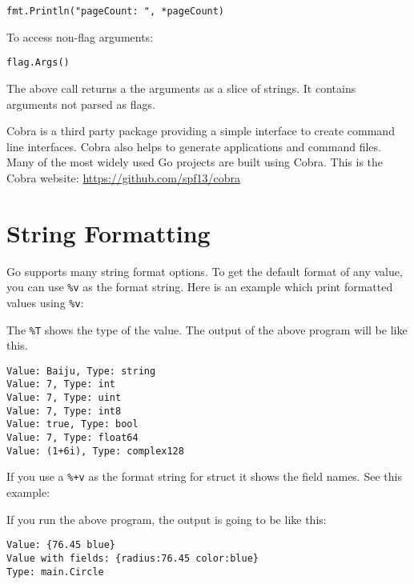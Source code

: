 \begin{lstlisting}[numbers=none]
fmt.Println("pageCount: ", *pageCount)
\end{lstlisting}

To access non-flag arguments:

\begin{lstlisting}[numbers=none]
flag.Args()
\end{lstlisting}

The above call returns a the arguments as a slice of strings.  It
contains arguments not parsed as flags.

Cobra is a third party package providing a simple interface to create
command line interfaces.  Cobra also helps to generate applications
and command files.  Many of the most widely used Go projects are built
using Cobra.  This is the Cobra
website: \url{https://github.com/spf13/cobra}

\section{String Formatting}

Go supports many string format options.  To
get the default format of any value, you can use \texttt{\%v} as the
format string.  Here is an example which print formatted values
using \texttt{\%v}:



The \texttt{\%T} shows the type of the value.  The output of the above
program will be like this.

\begin{lstlisting}[numbers=none]
Value: Baiju, Type: string
Value: 7, Type: int
Value: 7, Type: uint
Value: 7, Type: int8
Value: true, Type: bool
Value: 7, Type: float64
Value: (1+6i), Type: complex128
\end{lstlisting}

If you use a \texttt{\%+v} as the format string for struct it shows
the field names.  See this example:



If you run the above program, the output is going to be like this:

\begin{lstlisting}[numbers=none]
Value: {76.45 blue}
Value with fields: {radius:76.45 color:blue}
Type: main.Circle
\end{lstlisting}


